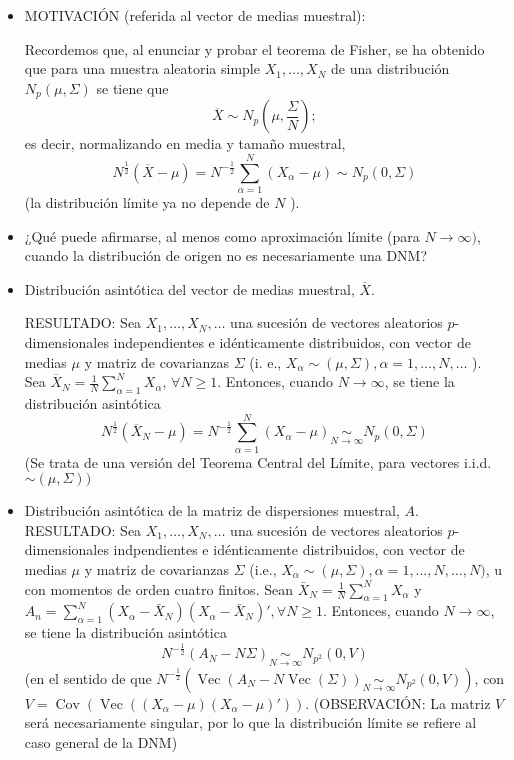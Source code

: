 \documentclass[11pt,a4paper]{article}
\begin{document}
\begin{itemize}
\item MOTIVACIÓN (referida al vector de medias muestral):

Recordemos que, al enunciar y probar el teorema de Fisher, se ha obtenido que para una muestra aleatoria simple $X_{1}, \ldots, X_{N}$ de una distribución $N_{p}(\mu, \Sigma)$ se tiene que
$$\overline{X} \sim N_{p}(\mu, \frac{\Sigma}{N});$$
es decir, normalizando en media y tamaño muestral,
$$N^{\frac{1}{2}}(\overline{X}-\mu)=N^{-\frac{1}{2}} \sum_{\alpha=1}^{N}(X_{\alpha}-\mu) \sim N_{p}(0, \Sigma)$$
(la distribución límite ya no depende de $N$ ).

\item ¿Qué puede afirmarse, al menos como aproximación límite (para $N \rightarrow \infty)$, cuando la distribución de origen no es necesariamente una DNM?

\item Distribución asintótica del vector de medias muestral, $\overline{X}$.

RESULTADO: Sea $X_{1}, \ldots, X_{N}, \ldots$ una sucesión de vectores aleatorios $p$-dimensionales independientes e idénticamente distribuidos, con vector de medias $\mu$ y matriz de covarianzas $\Sigma$ (i. e., $X_{\alpha} \sim(\mu, \Sigma), \alpha=1, \ldots, N, \ldots$ ). Sea $\overline{X}_{N}=\frac{1}{N} \sum_{\alpha=1}^{N} X_{\alpha}$, $\forall N \geq 1$. Entonces, cuando $N \to \infty$, se tiene la distribución asintótica
$$N^{\frac{1}{2}}(\overline{X}_{N}-\mu)=N^{-\frac{1}{2}} \sum_{\alpha=1}^{N}(X_{\alpha}-\mu) \underset{N \to \infty}{\sim} N_{p}(0, \Sigma)$$
(Se trata de una versión del Teorema Central del Límite, para vectores i.i.d. $\sim(\mu, \Sigma))$

\item Distribución asintótica de la matriz de dispersiones muestral, $A$. \\
RESULTADO: Sea $X_{1}, \dots, X_{N}, \dots$ una sucesión de vectores aleatorios $p$-dimensionales indpendientes e idénticamente distribuidos, con vector de medias $\mu$ y matriz de covarianzas $\Sigma$ (i.e., $X_{\alpha} \sim (\mu, \Sigma), \alpha = 1, \dots, N, \dots, N)$, u con momentos de orden cuatro finitos. Sean $\bar{X}_{N} = \frac{1}{N}\sum_{\alpha=1}^{N} X_{\alpha}$ y $A_{n} = \sum_{\alpha=1}^{N}(X_{\alpha} - \bar{X}_{N})(X_{\alpha} - \bar{X}_{N})', \forall N \geq 1$. Entonces, cuando $N \to \infty$, se tiene la distribución asintótica
$$N^{-\frac{1}{2}}(A_{N} - N\Sigma) \underset{N \to \infty}{\sim} N_{p^{2}}(0, V)$$
(en el sentido de que $N^{-\frac{1}{2}}(\operatorname{Vec}(A_{N} - N\operatorname{Vec}(\Sigma)) \underset{N \to \infty}{\sim} N_{p^{2}}(0, V))$, con $V = \operatorname{Cov}(\operatorname{Vec}((X_{\alpha} - \mu)(X_{\alpha} - \mu)'))$.
(OBSERVACIÓN: La matriz $V$ será necesariamente singular, por lo que la distribución límite se refiere al caso general de la DNM)
\end{itemize}
\end{document}
